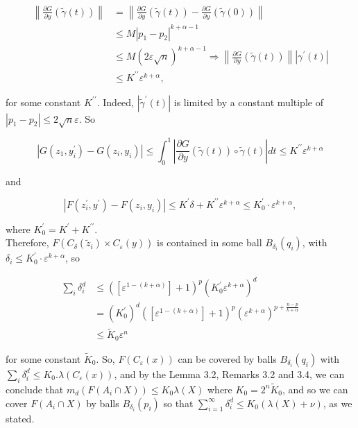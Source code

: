 \documentclass[10pt]{article}
\begin{document}
$$
\begin{aligned}
\left\|\frac{\partial G}{\partial y}(\widetilde{\gamma}(t))\right\| & =\left\|\frac{\partial G}{\partial y}(\widetilde{\gamma}(t))-\frac{\partial G}{\partial y}(\widetilde{\gamma}(0))\right\| \\
& \leq M\left|p_{1}-p_{2}\right|^{k+\alpha-1} \\
& \leq M(2 \varepsilon \sqrt{n})^{k+\alpha-1} \Rightarrow\left\|\frac{\partial G}{\partial y}(\widetilde{\gamma}(t))\right\|\left|\gamma^{\prime}(t)\right| \\
& \leq K^{\prime \prime} \varepsilon^{k+\alpha},
\end{aligned}
$$

for some constant $K^{\prime \prime}$. Indeed, $\left|\widetilde{\gamma}^{\prime}(t)\right|$ is limited by a constant multiple of $\left|p_{1}-p_{2}\right| \leq 2 \sqrt{n} \varepsilon$. So

$$
\left|G\left(z_{1}, y_{i}^{\prime}\right)-G\left(z_{i}, y_{i}\right)\right| \leq \int_{0}^{1}\left|\frac{\partial G}{\partial y}(\widetilde{\gamma}(t)) \circ \widetilde{\gamma}(t)\right| d t \leq K^{\prime \prime} \varepsilon^{k+\alpha}
$$

and

$$
\left|F\left(z_{i}^{\prime}, y^{\prime}\right)-F\left(z_{i}, y_{i}\right)\right| \leq K^{\prime} \delta+K^{\prime \prime} \varepsilon^{k+\alpha} \leq K_{0}^{\prime} \cdot \varepsilon^{k+\alpha},
$$

where $K_{0}^{\prime}=K^{\prime}+K^{\prime \prime}$.\\
Therefore, $F\left(C_{\delta}\left(\widetilde{z}_{i}\right) \times C_{\varepsilon}(y)\right)$ is contained in some ball $B_{\delta_{i}}\left(q_{i}\right)$, with $\delta_{i} \leq K_{0}^{\prime} \cdot \varepsilon^{k+\alpha}$, so

$$
\begin{aligned}
\sum_{i} \delta_{i}^{d} & \leq\left(\left[\varepsilon^{1-(k+\alpha)}\right]+1\right)^{p}\left(K_{0}^{\prime} \varepsilon^{k+\alpha}\right)^{d} \\
& =\left(K_{0}^{\prime}\right)^{d}\left(\left[\varepsilon^{1-(k+\alpha)}\right]+1\right)^{p}\left(\varepsilon^{k+\alpha}\right)^{p+\frac{n-p}{k+\alpha}} \\
& \leq \widetilde{K}_{0} \varepsilon^{n}
\end{aligned}
$$

for some constant $\widetilde{K}_{0}$. So, $F\left(C_{\varepsilon}(x)\right)$ can be covered by balls $B_{\delta_{i}}\left(q_{i}\right)$ with $\sum_{i} \delta_{i}^{d} \leq K_{0} . \lambda\left(C_{\varepsilon}(x)\right)$, and by the Lemma 3.2, Remarks 3.2 and 3.4, we can conclude that $m_{d}\left(F\left(A_{i} \cap X\right)\right) \leq K_{0} \lambda(X)$ where $K_{0}=2^{n} \widetilde{K}_{0}$, and so we can cover $F\left(A_{i} \cap X\right)$ by balls $B_{\delta_{i}}\left(p_{i}\right)$ so that $\sum_{i=1}^{\infty} \delta_{i}^{d} \leq K_{0}(\lambda(X)+\nu)$, as we stated.
\end{document}
